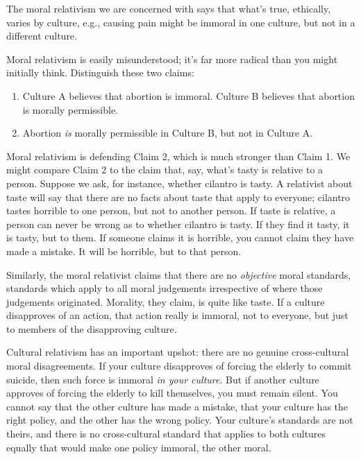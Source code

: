 \documentclass[]{article}
\begin{document}
The moral relativism we are concerned with says that what's true,
ethically, varies by culture, e.g., causing pain might be immoral in one
culture, but not in a different culture.

Moral relativism is easily misunderstood; it's far more radical than you
might initially think. Distinguish these two claims:

\begin{enumerate}
\def\labelenumi{\arabic{enumi}.}
\itemsep1pt\parskip0pt
\item
  Culture A believes that abortion is immoral. Culture B believes that
  abortion is morally permissible.
\item
  Abortion \emph{is} morally permissible in Culture B, but not in
  Culture A.
\end{enumerate}

Moral relativism is defending Claim 2, which is much stronger than Claim
1. We might compare Claim 2 to the claim that, say, what's tasty is
relative to a person. Suppose we ask, for instance, whether cilantro is
tasty. A relativist about taste will say that there are no facts about
taste that apply to everyone; cilantro tastes horrible to one person,
but not to another person. If taste is relative, a person can never be
wrong as to whether cilantro is tasty. If they find it tasty, it is
tasty, but to them. If someone claims it is horrible, you cannot claim
they have made a mistake. It will be horrible, but to that person.

Similarly, the moral relativist claims that there are no
\emph{objective} moral standards, standards which apply to all moral
judgements irrespective of where those judgements originated. Morality,
they claim, is quite like taste. If a culture disapproves of an action,
that action really is immoral, not to everyone, but just to members of
the disapproving culture.

Cultural relativism has an important upshot: there are no genuine
cross-cultural moral disagreements. If your culture disapproves of
forcing the elderly to commit suicide, then such force is immoral
\emph{in your culture}. But if another culture approves of forcing the
elderly to kill themselves, you must remain silent. You cannot say that
the other culture has made a mistake, that your culture has the right
policy, and the other has the wrong policy. Your culture's standards are
not theirs, and there is no cross-cultural standard that applies to both
cultures equally that would make one policy immoral, the other moral.
\end{document}
